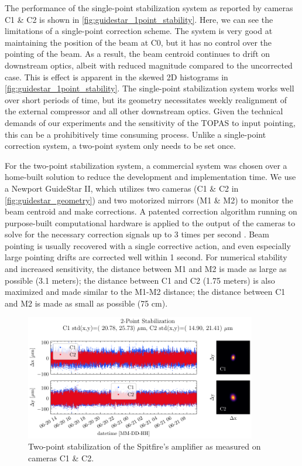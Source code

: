 The performance of the single-point stabilization system as reported by cameras C1 \& C2 is shown in \cref{fig:guidestar_1point_stability}. Here, we can see the limitations of a single-point correction scheme. The system is very good at maintaining the position of the beam at C0, but it has no control over the pointing of the beam. As a result, the beam centroid continues to drift on downstream optics, albeit with reduced magnitude compared to the uncorrected case. This is effect is apparent in the skewed 2D histograms in \cref{fig:guidestar_1point_stability}. The single-point stabilization system works well over short periods of time, but its geometry necessitates weekly realignment of the external compressor and all other downstream optics. Given the technical demands of our experiments and the sensitivity of the TOPAS to input pointing, this can be a prohibitively time consuming process. Unlike a single-point correction system, a two-point system only needs to be set once.

For the two-point stabilization system, a commercial system was chosen over a home-built solution to reduce the development and implementation time. We use a Newport GuideStar II, which utilizes two cameras (C1 \& C2 in \cref{fig:guidestar_geometry}) and two motorized mirrors (M1 \& M2) to monitor the beam centroid and make corrections. A patented correction algorithm running on purpose-built computational hardware is applied to the output of the cameras to solve for the necessary correction signals up to 3 times per second \cite{farinasOpticalBeamSteering2009}. Beam pointing is usually recovered with a single corrective action, and even especially large pointing drifts are corrected well within 1 second. For numerical stability and increased sensitivity, the distance between M1 and M2 is made as large as possible (3.1 meters); the distance between C1 and C2 (1.75 meters) is also maximized and made similar to the M1-M2 distance; the distance between C1 and M2 is made as small as possible (75 cm).

\begin{figure}
	\centering
	\includegraphics[width=0.9\textwidth]{figures/chap2/Stability_GuideStarII_ON.pdf}
	\caption{Two-point stabilization of the Spitfire's amplifier as measured on cameras C1 \& C2.}
	\label{fig:guidestar_2point_stability}
\end{figure}

